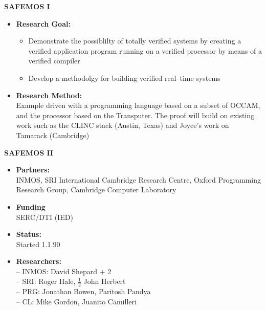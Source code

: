 \begin{center}{\bf SAFEMOS I}\end{center}
\begin{itemize}
\item {\bf Research Goal:}
\begin{itemize}
\item Demonstrate the possiblilty of totally verified systems by creating
a verified application program running on a verified processor by
means of a verified compiler
\item Develop a methodolgy for building verified real--time systems
\end{itemize}
\item {\bf Research Method:} $\;$ \\
Example driven with a programming language based on a subset of {\small OCCAM},
and the processor based on the Transputer.  The proof will build on existing
work such as the {\small CLINC} stack (Austin, Texas) and Joyce's work on 
Tamarack (Cambridge)
\end{itemize}

\begin{center}{\bf SAFEMOS II}\end{center}
\begin{itemize}
\item {\bf Partners:}$\;$\\
{\small INMOS}, {\small SRI} International Cambridge Research Centre,
Oxford Programming Research Group, Cambridge Computer Laboratory
\item {\bf Funding}$\;$\\
{\small SERC}/{\small DTI} ({\small IED})
\item {\bf Status:}$\;$ \\
Started 1.1.90
\item {\bf Researchers:} $\;$ \\
-- {\small INMOS}: David Shepard + 2 \\
-- {\small SRI}: Roger Hale, $\frac{1}{2}$ John Herbert \\
-- {\small PRG}: Jonathan Bowen, Paritosh Pandya \\
-- {\small CL}: Mike Gordon, Juanito Camilleri
\end{itemize}

